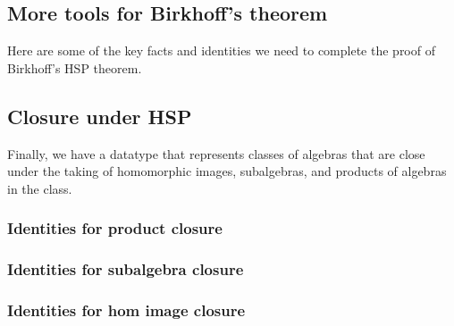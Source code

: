 \documentclass[a4paper,USenglish,cleveref,autoref,thm-restate]{lipics-v2019}
\begin{document}
\subsection{More tools for Birkhoff's theorem}\label{more-tools-for-birkhoffs-theorem}
Here are some of the key facts and identities we need to complete the proof of Birkhoff's HSP theorem.
\begin{code}\end{code}


\subsection{Closure under HSP}\label{closure-under-hsp}
Finally, we have a datatype that represents classes of algebras that are close under the taking of homomorphic images, subalgebras, and products of algebras in the class.
\subsubsection{Identities for product closure}\label{identities-for-product-closure}
\begin{code}\end{code}


\subsubsection{Identities for subalgebra closure}\label{identities-for-subalgebra-closure}
\begin{code}\end{code}

\subsubsection{Identities for hom image closure}\label{identities-for-hom-image-closure}
\begin{code}\end{code}
\end{document}
